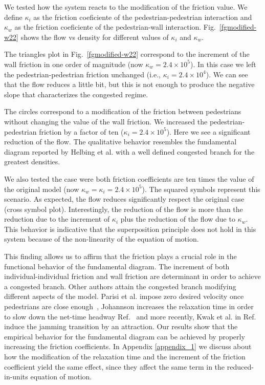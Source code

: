 We tested how the system reacts to the modification of the friction value. We define $\kappa_i$ as the friction coeficiente of the pedestrian-pedestrian interaction and $\kappa_w$ as the friction coeficiente of the pedestrian-wall interaction. Fig.~\ref{fgmodified-w22} shows the flow vs density for different values of $\kappa_i$ and $\kappa_w$.

The triangles plot in Fig.~\ref{fgmodified-w22} correspond to the increment of the wall friction in one order of magnitude (now $\kappa_w = 2.4\times10^{5}$). In this case we left the pedestrian-pedestrian friction unchanged (i.e., $\kappa_i = 2.4\times10^{4}$). We can see that the flow reduces a little bit, but this is not enough to produce the negative slope that characterizes the congested regime. 

The circles correspond to a modification of the friction between pedestrians without changing the value of the wall friction. We increased the pedestrian-pedestrian friction by a factor of ten ($\kappa_i = 2.4\times10^{5}$). Here we see a significant reduction of the flow. The qualitative behavior resembles the fundamental diagram reported by Helbing et al. with a well defined congested branch for the greatest densities.

We also tested the case were both friction coefficients are ten times the value of the original model (now $\kappa_w = \kappa_i = 2.4\times10^{5}$). The squared symbols represent this scenario. As expected, the flow reduces significantly respect the original case (cross symbol plot). Interestingly, the reduction of the flow is more than the reduction due to the increment of $\kappa_i$ plus the reduction of the flow due to $\kappa_w$. This behavior is indicative that the superposition principle does not hold in this system because of the non-linearity of the equation of motion.   

This finding allows us to affirm that the friction plays a crucial role in the functional behavior of the fundamental diagram. The increment of both individual-individual friction and wall friction are determinant in order to achieve a congested branch. Other authors attain the congested branch modifying different aspects of the model. Parisi et al. impose zero desired velocity once pedestrians are close enough~\cite{parisi2}, Johannson increases the relaxation time in order to slow down the net-time headway Ref.~\cite{johansson} and more recently, Kwak et al. in Ref.~\cite{kwak} induce the jamming transition by an attraction. Our results show that the empirical behavior for the fundamental diagram can be achieved by properly increasing the friction coefficients. In Appendix \ref{appendix_1} we discuss about how the modification of the relaxation time and the increment of the friction coefficient yield the same effect, since they affect the same term in the reduced-in-units equation of motion.  

